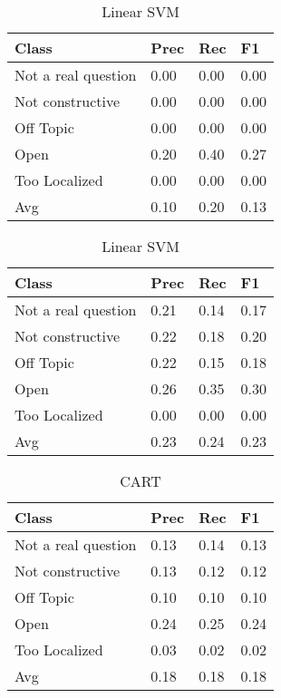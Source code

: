 \begin{table}[!htpb]
\centering
\begin{minipage}{.5\linewidth}
    \begin{tabular}{|l|l|l|l|} \hline
    \textbf{Class}& \textbf{Prec} & \textbf{Rec} & \textbf{F1} \\ \hline
    Not a real question & 0.00      & 0.00   & 0.00     \\
    Not constructive    & 0.00      & 0.00   & 0.00     \\
    Off Topic           & 0.00      & 0.00   & 0.00     \\
    Open                & 0.20      & 0.40   & 0.27     \\
    Too Localized       & 0.00      & 0.00   & 0.00     \\ \hline
    Avg                 & 0.10      & 0.20   & 0.13   \\ \hline   
    \end{tabular}
    \caption{Radial SVM}
    \label{tab:rsvm}
\end{minipage}%
\begin{minipage}{.5\linewidth}
    \begin{tabular}{|l|l|l|l|} \hline
    \textbf{Class}& \textbf{Prec} & \textbf{Rec} & \textbf{F1} \\ \hline
    Not a real question & 0.21      & 0.14   & 0.17     \\
    Not constructive    & 0.22      & 0.18   & 0.20     \\
    Off Topic           & 0.22      & 0.15   & 0.18     \\
    Open                & 0.26      & 0.35   & 0.30     \\
    Too Localized       & 0.00      & 0.00   & 0.00     \\ \hline
    Avg                 & 0.23      & 0.24   & 0.23   \\ \hline  
    \end{tabular}
    \caption{Linear SVM}
    \label{tab:lsvm}
\end{minipage}

\end{table}

\begin{table}[!htpb]
\centering
\begin{tabular}{|l|l|l|l|} \hline
\textbf{Class}& \textbf{Prec} & \textbf{Rec} & \textbf{F1} \\ \hline
Not a real question & 0.13      & 0.14   & 0.13     \\
Not constructive    & 0.13      & 0.12   & 0.12     \\
Off Topic           & 0.10      & 0.10   & 0.10     \\
Open                & 0.24      & 0.25   & 0.24     \\
Too Localized       & 0.03      & 0.02   & 0.02     \\ \hline
Avg                 & 0.18      & 0.18   & 0.18   \\ \hline  
\end{tabular}
\caption{CART}
\label{tab:cart}
\end{table}